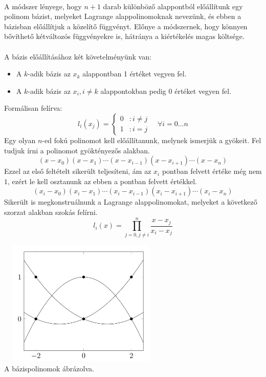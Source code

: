 \documentclass[12pt]{report}
\begin{document}
\paragraph{}
A módszer lényege, hogy $n+1$ darab különböző alappontból előállítunk egy polinom bázist, melyeket Lagrange alappolinomoknak nevezünk, és ebben a bázisban előállítjuk a közelítő függvényt. Előnye a módszernek, hogy könnyen bővíthető kétváltozós függvényekre is, hátránya a kiértékelés magas költsége.
\paragraph{}
A bázis előállításához két követelményünk van:
\begin{itemize}
\item A $k$-adik bázis az $x_k$ alappontban 1 értéket vegyen fel.
\item A $k$-adik bázis az $x_i, i \neq k$ alappontokban pedig 0 értéket vegyen fel.
\end{itemize}
Formálisan felírva:
$$
l_i(x_j) =
\left\{
  \begin{array}{lr}
    0 & : i \neq j\\
    1 & : i = j
  \end{array}
\right.
\quad \forall i = 0 \dots n
$$
Egy olyan $n$-ed fokú polinomot kell előállítanunk, melynek ismerjük a gyökeit. Fel tudjuk írni a polinomot gyöktényezős alakban.
$$
(x-x_0)(x-x_1)\cdots(x-x_{i-1})(x-x_{i+1})\cdots(x-x_n)
$$
Ezzel az első feltételt sikerült teljesíteni, ám az $x_i$ pontban felvett értéke még nem $1$, ezért le kell osztanunk az ebben a pontban felvett értékkel.
$$
(x_i-x_0)(x_i-x_1)\cdots(x_i-x_{i-1})(x_i-x_{i+1})\cdots(x_i-x_n)
$$
Sikerült is megkonstruálnunk a Lagrange alappolinomokat, melyeket a következő szorzat alakban szokás felírni.
$$
l_i(x) = \prod_{j = 0, j \neq i}^{n} \frac{x-x_j}{x_i-x_j}
$$
\begin{center}
\includegraphics[width=8cm,height=6cm]{pics/lagrange_basis}\\
{\footnotesize A bázispolinomok ábrázolva.}
\end{center}
\end{document}
